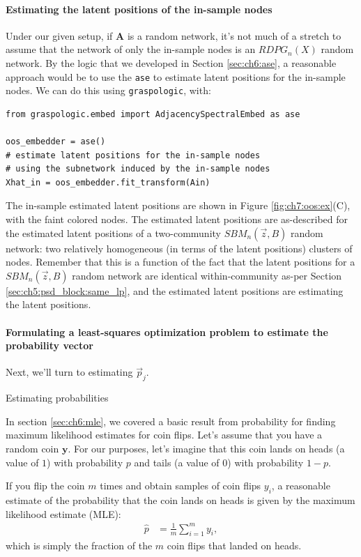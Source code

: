 \paragraph*{Estimating the latent positions of the in-sample nodes}
Under our given setup, if $\mathbf A$ is a random network, it's not much of a stretch to assume that the network of only the in-sample nodes is an $RDPG_n(X)$ random network. By the logic that we developed in Section \ref{sec:ch6:ase}, a reasonable approach would be to use the \texttt{ase} to estimate latent positions for the in-sample nodes. We can do this using \texttt{graspologic}, with:

\begin{lstlisting}[style=python]
from graspologic.embed import AdjacencySpectralEmbed as ase

oos_embedder = ase()
# estimate latent positions for the in-sample nodes
# using the subnetwork induced by the in-sample nodes
Xhat_in = oos_embedder.fit_transform(Ain)
\end{lstlisting}

The in-sample estimated latent positions are shown in Figure \ref{fig:ch7:oos:ex}(C), with the faint colored nodes. The estimated latent positions are as-described for the estimated latent positions of a two-community $SBM_n(\vec z, B)$ random network: two relatively homogeneous (in terms of the latent positions) clusters of nodes. Remember that this is a function of the fact that the latent positions for a $SBM_n(\vec z, B)$ random network are identical within-community as-per Section \ref{sec:ch5:psd_block:same_lp}, and the estimated latent positions are estimating the latent positions.

\paragraph*{Formulating a least-squares optimization problem to estimate the probability vector}

Next, we'll turn to estimating $\vec p_j$.

\begin{floatingbox}[h]\caption{Estimating probabilities}
\label{box:ch7:oos:probs}
In section \ref{sec:ch6:mle}, we covered a basic result from probability for finding maximum likelihood estimates for coin flips. Let's assume that you have a random coin $\mathbf y$. For our purposes, let's imagine that this coin lands on heads (a value of $1$) with probability $p$ and tails (a value of $0$) with probability $1 - p$.

If you flip the coin $m$ times and obtain samples of coin flips $y_i$, a reasonable estimate of the probability that the coin lands on heads is given by the maximum likelihood estimate (MLE):
\begin{align*}
    \hat p &= \frac{1}{m}\sum_{i = 1}^m y_i,
\end{align*}
which is simply the fraction of the $m$ coin flips that landed on heads. 
\end{floatingbox}

